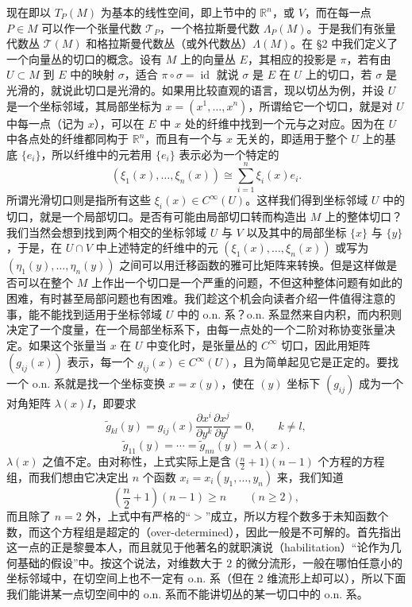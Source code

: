 现在即以 $T_P(M)$ 为基本的线性空间，即上节中的 $\mathbb R^n$，或 $V$，而在每一点 $P\in M$ 可以作一个张量代数 $\mathcal T_P$，一个格拉斯曼代数 $\Lambda_P(M)$。于是我们有张量代数丛 $\mathcal T(M)$ 和格拉斯曼代数丛（或外代数丛）$\Lambda(M)$。在 §2 中我们定义了一个向量丛的切口的概念。设有 $M$ 上的向量丛 $E$，其相应的投影是 $\pi$，若有由 $U\subset M$ 到 $E$ 中的映射 $\sigma$，适合 $\pi\circ\sigma=\operatorname{id}$ 就说 $\sigma$ 是 $E$ 在 $U$ 上的切口，若 $\sigma$ 是光滑的，就说此切口是光滑的。如果用比较直观的语言，现以切丛为例，并设 $U$ 是一个坐标邻域，其局部坐标为 $x=(x^1,\ldots,x^n)$，所谓给它一个切口，就是对 $U$ 中每一点（记为 $x$），可以在 $E$ 中 $x$ 处的纤维中找到一个元与之对应。因为在 $U$ 中各点处的纤维都同构于 $\mathbb R^n$，而且有一个与 $x$ 无关的，即适用于整个 $U$ 上的基底 $\{e_i\}$，所以纤维中的元若用 $\{e_i\}$ 表示必为一个特定的
\[
 (\xi_1(x),\ldots,\xi_n(x))\cong\sum_{i=1}^n\xi_i(x)e_i.
\]
所谓光滑切口则是指所有这些 $\xi_i(x)\in C^\infty(U)$。这样我们得到坐标邻域 $U$ 中的切口，就是一个局部切口。是否有可能由局部切口转而构造出 $M$ 上的整体切口？我们当然会想到找到两个相交的坐标邻域 $U$ 与 $V$ 以及其中的局部坐标 $\{x\}$ 与 $\{y\}$，于是，在 $U\cap V$ 中上述特定的纤维中的元 $(\xi_1(x),\ldots,\xi_n(x))$ 或写为 $(\eta_1(y),\ldots,\eta_n(y))$ 之间可以用迁移函数的雅可比矩阵来转换。但是这样做是否可以在整个 $M$ 上作出一个切口是一个严重的问题，不但这种整体问题有如此的困难，有时甚至局部问题也有困难。我们趁这个机会向读者介绍一件值得注意的事，能不能找到适用于坐标邻域 $U$ 中的 o.n. 系？o.n. 系显然来自内积，而内积则决定了一个度量，在一个局部坐标系下，由每一点处的一个二阶对称协变张量决定。如果这个张量当 $x$ 在 $U$ 中变化时，是张量丛的 $C^\infty$ 切口，因此用矩阵 $(g_{ij}(x))$ 表示，每一个 $g_{ij}(x)\in C^\infty(U)$，且为简单起见它是正定的。要找一个 o.n. 系就是找一个坐标变换 $x=x(y)$，使在 $(y)$ 坐标下 $(g_{ij})$ 成为一个对角矩阵 $\lambda(x)I$，即要求
\[
 \tilde g_{kl}(y)=g_{ij}(x)\frac{\partial x^i}{\partial y^k}\frac{\partial x^j}{\partial y^l}=0,\qquad k\ne l,
\]
\[
 \tilde g_{11}(y)=\cdots=\tilde g_{nn}(y)=\lambda(x).
\]
$\lambda(x)$ 之值不定。由对称性，上式实际上是含 $\bigl(\frac n2+1\bigr)(n-1)$ 个方程的方程组，而我们想由它决定出 $n$ 个函数 $x_i=x_i(y_1,\ldots,y_n)$ 来，我们知道
\[
 \left(\frac n2+1\right)(n-1)\ge n\qquad(n\ge2),
\]
而且除了 $n=2$ 外，上式中有严格的“$>$”成立，所以方程个数多于未知函数个数，而这个方程组是超定的（over-determined），因此一般是不可解的。首先指出这一点的正是黎曼本人，而且就见于他著名的就职演说（habilitation）“论作为几何基础的假设”中。按这个说法，对维数大于 $2$ 的微分流形，一般在哪怕任意小的坐标邻域中，在切空间上也不一定有 o.n. 系（但在 $2$ 维流形上却可以），所以下面我们能讲某一点切空间中的 o.n. 系而不能讲切丛的某一切口中的 o.n. 系。

